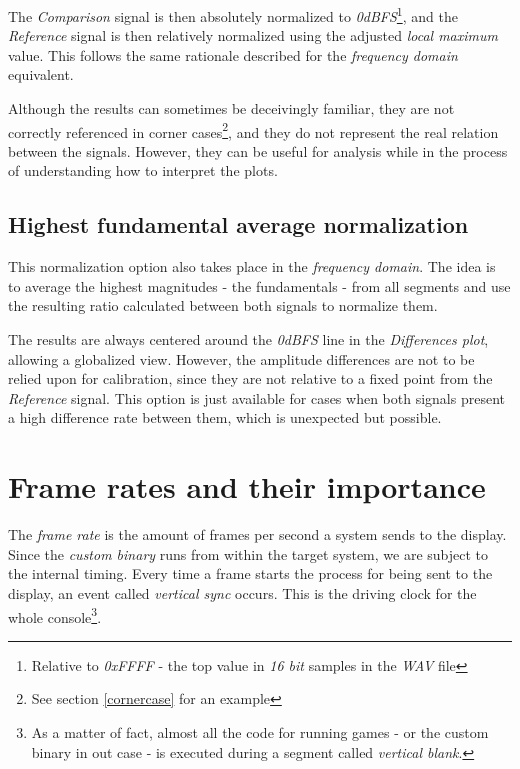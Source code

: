 \documentclass[10pt,a4paper]{report}
\begin{document}
\begin{appendices}
The \textit{Comparison} signal is then absolutely normalized to \textit{0dBFS}\footnote{Relative to \textit{0xFFFF} - the top value in \textit{16 bit} samples in the \textit{WAV} file}, and the \textit{Reference} signal is then relatively normalized using the adjusted \textit{local maximum} value. This follows the same rationale described for the \textit{frequency domain} equivalent.

Although the results can sometimes be deceivingly familiar, they are not correctly referenced in corner cases\footnote{See section \ref{cornercase} for an example}, and they do not represent the real relation between the signals. However, they can be useful for analysis while in the process of understanding how to interpret the plots.

\section{Highest fundamental average normalization}

This normalization option also takes place in the \textit{frequency domain}. The idea is to average the highest magnitudes - the fundamentals - from all segments and use the resulting ratio calculated between both signals to normalize them.

The results are always centered around the \textit{0dBFS} line in the \textit{Differences plot}, allowing a globalized view. However, the amplitude differences are not to be relied upon for calibration, since they are not relative to a fixed point from the \textit{Reference} signal. This option is just available for cases when both signals present a high difference rate between them, which is unexpected but possible.

\chapter{Frame rates and their importance}
\label{framerate}

The \textit{frame rate} is the amount of frames per second a system sends to the display. Since the \textit{custom binary} runs from within the target system, we are subject to the internal timing. Every time a frame starts the process for being sent to the display, an event called \textit{vertical sync} occurs. This is the driving clock for the whole console\footnote{As a matter of fact, almost all the code for running games - or the custom binary in out case - is executed during a segment called \textit{vertical blank}.}.


\end{appendices}
\end{document}
